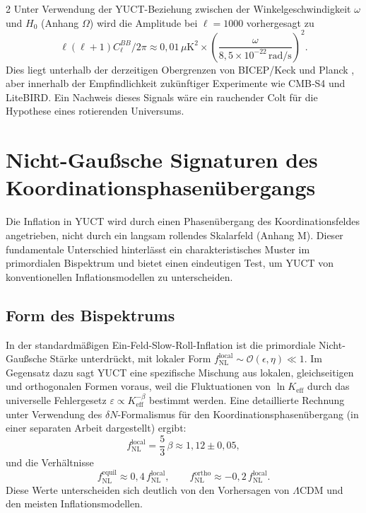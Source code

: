 \documentclass[11pt,a4paper]{article}
\begin{document}
\begin{multicols}{2}
		Unter Verwendung der YUCT-Beziehung zwischen der Winkelgeschwindigkeit $\omega$ und $H_0$ (Anhang $\Omega$) wird die Amplitude bei $\ell=1000$ vorhergesagt zu
		\begin{equation}
			\ell(\ell+1)C_\ell^{BB}/2\pi \approx 0,01\,\mu\text{K}^2 \times \left(\frac{\omega}{8,5\times10^{-22}\,\text{rad/s}}\right)^2.
			\label{eq:BB_amplitude}
		\end{equation}
		Dies liegt unterhalb der derzeitigen Obergrenzen von BICEP/Keck und Planck \cite{BICEP2021}, aber innerhalb der Empfindlichkeit zukünftiger Experimente wie CMB‑S4 und LiteBIRD. Ein Nachweis dieses Signals wäre ein rauchender Colt für die Hypothese eines rotierenden Universums.
		
		\section{Nicht-Gaußsche Signaturen des Koordinationsphasenübergangs}
		\label{sec:nongaussian}
		
		Die Inflation in YUCT wird durch einen Phasenübergang des Koordinationsfeldes angetrieben, nicht durch ein langsam rollendes Skalarfeld (Anhang M). Dieser fundamentale Unterschied hinterlässt ein charakteristisches Muster im primordialen Bispektrum und bietet einen eindeutigen Test, um YUCT von konventionellen Inflationsmodellen zu unterscheiden.
		
		\subsection{Form des Bispektrums}
		In der standardmäßigen Ein-Feld-Slow-Roll-Inflation ist die primordiale Nicht-Gaußsche Stärke unterdrückt, mit lokaler Form $f_{\mathrm{NL}}^{\mathrm{local}} \sim \mathcal{O}(\epsilon,\eta) \ll 1$. Im Gegensatz dazu sagt YUCT eine spezifische Mischung aus lokalen, gleichseitigen und orthogonalen Formen voraus, weil die Fluktuationen von $\ln K_{\mathrm{eff}}$ durch das universelle Fehlergesetz $\varepsilon \propto K_{\mathrm{eff}}^{-\beta}$ bestimmt werden. Eine detaillierte Rechnung unter Verwendung des $\delta N$-Formalismus für den Koordinationsphasenübergang (in einer separaten Arbeit dargestellt) ergibt:
		\begin{equation}
			f_{\mathrm{NL}}^{\mathrm{local}} = \frac{5}{3}\,\beta \approx 1,12 \pm 0,05,
		\end{equation}
		und die Verhältnisse
		\begin{equation}
			f_{\mathrm{NL}}^{\mathrm{equil}} \approx 0,4\, f_{\mathrm{NL}}^{\mathrm{local}}, \qquad
			f_{\mathrm{NL}}^{\mathrm{ortho}} \approx -0,2\, f_{\mathrm{NL}}^{\mathrm{local}}.
		\end{equation}
		Diese Werte unterscheiden sich deutlich von den Vorhersagen von $\Lambda$CDM und den meisten Inflationsmodellen.
		

\end{multicols}
\end{document}
